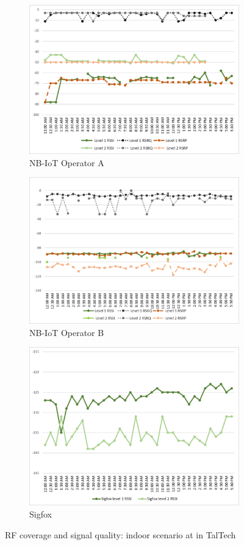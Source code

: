 \documentclass[conference,a4paper,xcolor=table]{IEEEtran}
\begin{document}
 \begin{figure}[t]
\begin{subfigure}[t]{\linewidth}
  \centering
  \includegraphics[width=.7\linewidth]{images/tallinn/ATallinnIndoor.pdf}  
  \caption{NB-IoT Operator A}
\end{subfigure}
\begin{subfigure}[t]{\linewidth}
  \centering
  \includegraphics[width=.7\linewidth]{images/tallinn/BTallinnIndoor.pdf}  
  \caption{NB-IoT Operator B}
  
\end{subfigure}
\begin{subfigure}[t]{\linewidth}
  \centering
  \includegraphics[width=.7\linewidth]{images/tallinn/STallinnIndoor.pdf}  
\caption{Sigfox}
 \end{subfigure}
\caption{RF coverage and signal quality: indoor scenario at in TalTech}
 \label{RFIndoor Tallinn}
\end{figure}
\end{document}
